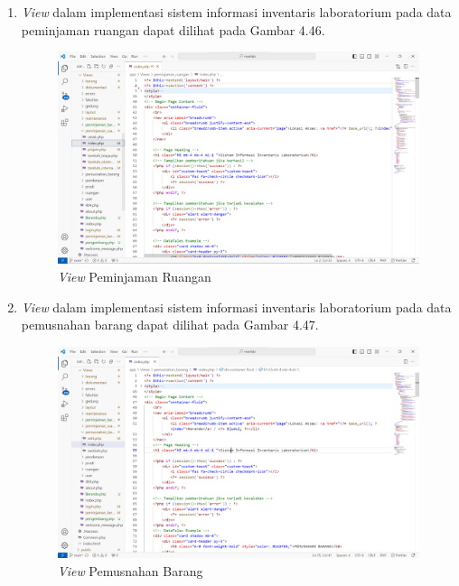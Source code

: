 \begin{enumerate}
  \item \textit{View} dalam implementasi sistem informasi inventaris laboratorium pada data peminjaman ruangan dapat dilihat pada Gambar 4.46.
        \begin{figure}
          \centering
          \includegraphics[width=0.82\linewidth]{konten//gambar/view peminjaman_ruangan.png}
          \caption{\textit{View} Peminjaman Ruangan}
          \label{fig:enter-label}
        \end{figure}

  \item \textit{View} dalam implementasi sistem informasi inventaris laboratorium pada data pemusnahan barang dapat dilihat pada Gambar 4.47.
        \begin{figure}
          \centering
          \includegraphics[width=0.82\linewidth]{konten//gambar/view pemusnahan_barang.png}
          \caption{\textit{View} Pemusnahan Barang}
          \label{fig:enter-label}
        \end{figure}


\end{enumerate}
